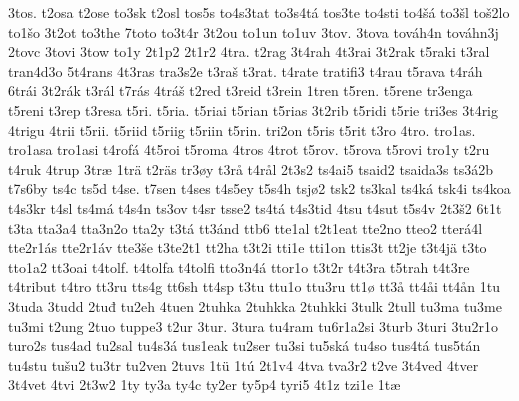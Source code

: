 {    3tos.
    t2osa
    t2ose
    to3sk
    t2osl
    tos5s
    to4s3tat
    to3s4tá
    tos3te
    to4sti
    to4šá
    to3šl
    toš2lo
    to1šo
    3t2ot
    to3the
    7toto
    to3t4r
    3t2ou
    to1un
    to1uv
    3tov.
    3tova
    továh4n
    továhn3j
    2tovc
    3tovi
    3tow
    to1y
    2t1p2
    2t1r2
    4tra.
    t2rag
    3t4rah
    4t3rai
    3t2rak
    t5raki
    t3ral
    tran4d3o
    5t4rans
    4t3ras
    tra3s2e
    t3raš
    t3rat.
    t4rate
    tratifi3
    t4rau
    t5rava
    t4ráh
    6trái
    3t2rák
    t3rál
    t7rás
    4tráš
    t2red
    t3reid
    t3rein
    1tren
    t5ren.
    t5rene
    tr3enga
    t5reni
    t3rep
    t3resa
    t5ri.
    t5ria.
    t5riai
    t5rian
    t5rias
    3t2rib
    t5ridi
    t5rie
    tri3es
    3t4rig
    4trigu
    4trii
    t5rii.
    t5riid
    t5riig
    t5riin
    t5rin.
    tri2on
    t5ris
    t5rit
    t3ro
    4tro.
    tro1as.
    tro1asa
    tro1asi
    t4rofá
    4t5roi
    t5roma
    4tros
    4trot
    t5rov.
    t5rova
    t5rovi
    tro1y
    t2ru
    t4ruk
    4trup
    3træ
    1trä
    t2räs
    tr3øy
    t3rå
    t4rål
    2t3s2
    ts4ai5
    tsaid2
    tsaida3s
    ts3á2b
    t7s6by
    ts4c
    ts5d
    t4se.
    t7sen
    t4ses
    t4s5ey
    t5s4h
    tsjø2
    tsk2
    ts3kal
    ts4ká
    tsk4i
    ts4koa
    t4s3kr
    t4sl
    ts4má
    t4s4n
    ts3ov
    t4sr
    tsse2
    ts4tá
    t4s3tid
    4tsu
    t4sut
    t5s4v
    2t3š2
    6t1t
    t3ta
    tta3a4
    tta3n2o
    tta2y
    t3tá
    tt3ánd
    ttb6
    tte1al
    t2t1eat
    tte2no
    tteo2
    tterá4l
    tte2r1ás
    tte2r1áv
    tte3še
    t3te2t1
    tt2ha
    t3t2i
    tti1e
    tti1on
    ttis3t
    tt2je
    t3t4jä
    t3to
    tto1a2
    tt3oai
    t4tolf.
    t4tolfa
    t4tolfi
    tto3n4á
    ttor1o
    t3t2r
    t4t3ra
    t5trah
    t4t3re
    t4tribut
    t4tro
    tt3ru
    tts4g
    tt6sh
    tt4sp
    t3tu
    ttu1o
    ttu3ru
    tt1ø
    tt3å
    tt4åi
    tt4ån
    1tu
    3tuda
    3tudd
    2tuđ
    tu2eh
    4tuen
    2tuhka
    2tuhkka
    2tuhkki
    3tulk
    2tull
    tu3ma
    tu3me
    tu3mi
    t2ung
    2tuo
    tuppe3
    t2ur
    3tur.
    3tura
    tu4ram
    tu6r1a2si
    3turb
    3turi
    3tu2r1o
    turo2s
    tus4ad
    tu2sal
    tu4s3á
    tus1eak
    tu2ser
    tu3si
    tu5ská
    tu4so
    tus4tá
    tus5tán
    tu4stu
    tušu2
    tu3tr
    tu2ven
    2tuvs
    1tü
    1tú
    2t1v4
    4tva
    tva3r2
    t2ve
    3t4ved
    4tver
    3t4vet
    4tvi
    2t3w2
    1ty
    ty3a
    ty4c
    ty2er
    ty5p4
    tyri5
    4t1z
    tzi1e
    1tæ
}
